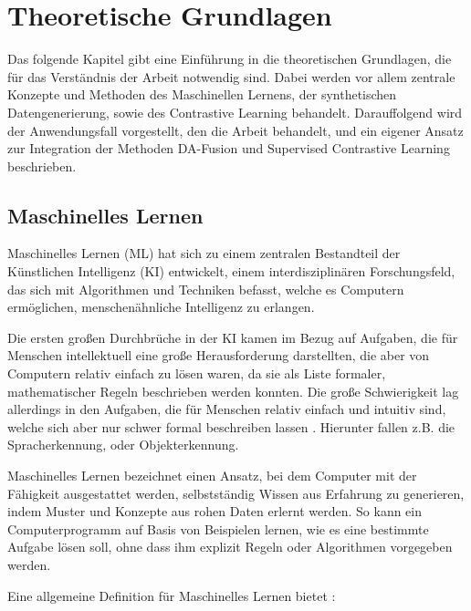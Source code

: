\chapter{Theoretische Grundlagen} \label{ch:theory}

Das folgende Kapitel gibt eine Einführung in die theoretischen Grundlagen, die für das Verständnis der Arbeit notwendig sind. Dabei werden vor allem zentrale Konzepte und Methoden des Maschinellen Lernens, der synthetischen Datengenerierung, sowie des Contrastive Learning behandelt. Darauffolgend wird der Anwendungsfall vorgestellt, den die Arbeit behandelt, und ein eigener Ansatz zur Integration der Methoden DA-Fusion und Supervised Contrastive Learning beschrieben.

\section{Maschinelles Lernen} \label{sec:ml}

Maschinelles Lernen (ML) hat sich zu einem zentralen Bestandteil der Künstlichen Intelligenz (KI) entwickelt, einem interdisziplinären Forschungsfeld, das sich mit Algorithmen und Techniken befasst, welche es Computern ermöglichen, menschenähnliche Intelligenz zu erlangen.

Die ersten großen Durchbrüche in der KI kamen im Bezug auf Aufgaben, die für Menschen intellektuell eine große Herausforderung darstellten, die aber von Computern relativ einfach zu lösen waren, da sie als Liste formaler, mathematischer Regeln beschrieben werden konnten. Die große Schwierigkeit lag allerdings in den Aufgaben, die für Menschen relativ einfach und intuitiv sind, welche sich aber nur schwer formal beschreiben lassen \parencite{Goodfellow2016deeplearning}. Hierunter fallen z.B. die Spracherkennung, oder Objekterkennung.

Maschinelles Lernen bezeichnet einen Ansatz, bei dem Computer mit der Fähigkeit ausgestattet werden, selbstständig Wissen aus Erfahrung zu generieren, indem Muster und Konzepte aus rohen Daten erlernt werden. So kann ein Computerprogramm auf Basis von Beispielen lernen, wie es eine bestimmte Aufgabe lösen soll, ohne dass ihm explizit Regeln oder Algorithmen vorgegeben werden.

Eine allgemeine Definition für Maschinelles Lernen bietet \parencite{Mitchell1997machinelearning}:


